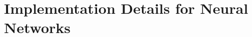 \documentclass[11pt]{exam}
\numberwithin{equation}{section} %
\numberwithin{figure}{section} %
\numberwithin{table}{section} %
\begin{document}

\clearpage
\appendix
\section{Implementation Details for Neural Networks}
\label{sec:implementationdetails}
\end{document}

